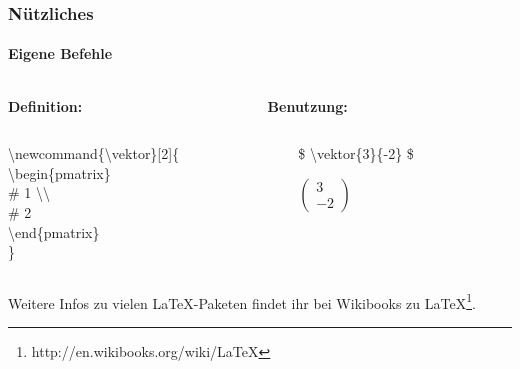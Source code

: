 
\begin{frame}
\frametitle{Nützliches}
\framesubtitle{Eigene Befehle}
\begin{columns}
\hspace*{4.7mm}
\begin{column}{0.5\textwidth}
\textbf{Definition:}\\
\end{column}
\begin{column}{0.5\textwidth}
\textbf{Benutzung:}\\
\end{column}
\end{columns}
\bigskip
\begin{columns}
\hspace*{4.7mm}
\begin{column}{0.5\textwidth}
\begin{ttfamily}{\normalsize
\color{nounibaredI}\textbackslash newcommand\color{black}\{\textbackslash vektor\}[2]\{\\
\color{unibablueI}\textbackslash begin\color{black}\{pmatrix\}\\
\color{unibayellowI}\# 1 \color{nounibaredI}\textbackslash \textbackslash\\
\color{unibayellowI} \# 2\\
\color{unibablueI}\textbackslash end\color{black}\{pmatrix\}\\
\}\\
}
\end{ttfamily}
\end{column}
\begin{column}{0.5\textwidth}
\begin{ttfamily}{\normalsize
\color{unibayellowI}\$ \color{nounibaredI}\textbackslash vektor\color{black}\{3\}\{-2\} \color{unibayellowI}\$ \\}
\end{ttfamily}
\medskip
$
\begin{pmatrix}
3 \\ -2
\end{pmatrix}
$
\end{column}
\end{columns}
\bigskip
Weitere Infos zu vielen \LaTeX -Paketen findet ihr bei Wikibooks zu \LaTeX\footnote{http://en.wikibooks.org/wiki/LaTeX}.\\
\end{frame}

